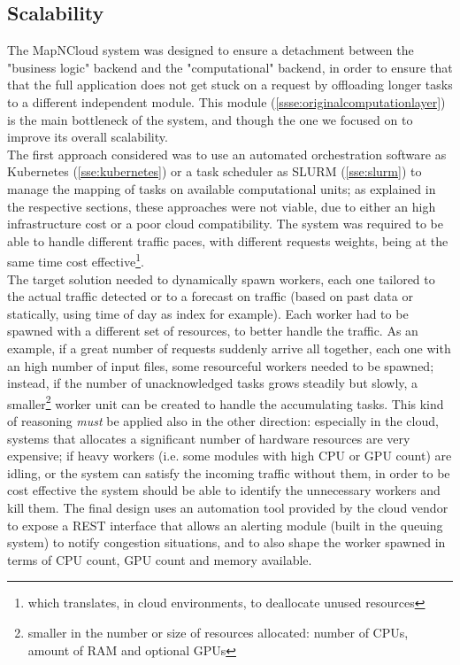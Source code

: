\subsection{Scalability}
  The MapNCloud system was designed to ensure a detachment between the "business logic" backend and the "computational" backend, in order to ensure that that the full application does not get stuck on a request by offloading longer tasks to a different independent module. This module (\ref{ssse:originalcomputationlayer}) is the main bottleneck of the system, and though the one we focused on to improve its overall scalability.\\
  The first approach considered was to use an automated orchestration software as Kubernetes (\ref{sse:kubernetes}) or a task scheduler as SLURM (\ref{sse:slurm}) to manage the mapping of tasks on available computational units; as explained in the respective sections, these approaches were not viable, due to either an high infrastructure cost or a poor cloud compatibility. The system was required to be able to handle different traffic paces, with different requests weights, being at the same time cost effective\footnote{which translates, in cloud environments, to deallocate unused resources}.\\
  The target solution needed to dynamically spawn workers, each one tailored to the actual traffic detected or to a forecast on traffic (based on past data or statically, using time of day as index for example). Each worker had to be spawned with a different set of resources, to better handle the traffic. As an example, if a great number of requests suddenly arrive all together, each one with an high number of input files, some resourceful workers needed to be spawned; instead, if the number of unacknowledged tasks grows steadily but slowly, a smaller\footnote{smaller in the number or size of resources allocated: number of CPUs, amount of RAM and optional GPUs} worker unit can be created to handle the accumulating tasks. This kind of reasoning \textit{must} be applied also in the other direction: especially in the cloud, systems that allocates a significant number of hardware resources are very expensive; if heavy workers (i.e. some modules with high CPU or GPU count) are idling, or the system can satisfy the incoming traffic without them, in order to be cost effective the system should be able to identify the unnecessary workers and kill them. The final design uses an automation tool provided by the cloud vendor to expose a REST interface that allows an alerting module (built in the queuing system) to notify congestion situations, and to also shape the worker spawned in terms of CPU count, GPU count and memory available.

